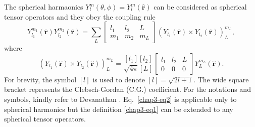 The spherical harmaonics $Y^m_l(\theta, \phi)= Y_l^m (\hat{{\boldsymbol  r}})$ can be considered as spherical tensor operators and they obey the coupling rule
\begin{equation}
Y_{l_1}^{m_1} (\hat{{\boldsymbol  r}}) Y_{l_2}^{m_2} (\hat{{\boldsymbol  r}}) = \sum_L 
	\begin{bmatrix}
		l_1 & l_2 & L\\
		m_1 &m_2  & m_L
	\end{bmatrix}
(Y_{l_1} (\hat{{\boldsymbol  r}}) \times Y_{l_2} (\hat{{\boldsymbol  r}}))^{m_L}_{L}, \label{chap3-eq1}
\end{equation}
where
\begin{equation}
(Y_{l_1}  (\hat{{\boldsymbol  r}})  \times Y_{l_2} (\hat{{\boldsymbol  r}}) )^{m_L}_{L} = \frac{[l_1][l_2]}{\sqrt{4\pi}[L]}
\begin{bmatrix}
l_1 & l_2 & L\\
0 & 0 & 0
\end{bmatrix}
Y_{L}^{m_L} (\hat{{\boldsymbol  r}}). \label{chap3-eq2} 
\end{equation}
For brevity, the symbol $[l]$ is used to denote $[l]=\sqrt{2l+1}$. The wide square bracket represents the Clebsch-Gordan (C.G.) coefficient. For the notations and symbols, kindly refer to Devanathan \cite{chap3-key11,chap3-key12}. Eq.~\eqref{chap3-eq2} is applicable only to spherical harmonics but the definition \eqref{chap3-eq1} can be extended to any spherical tensor operators.

